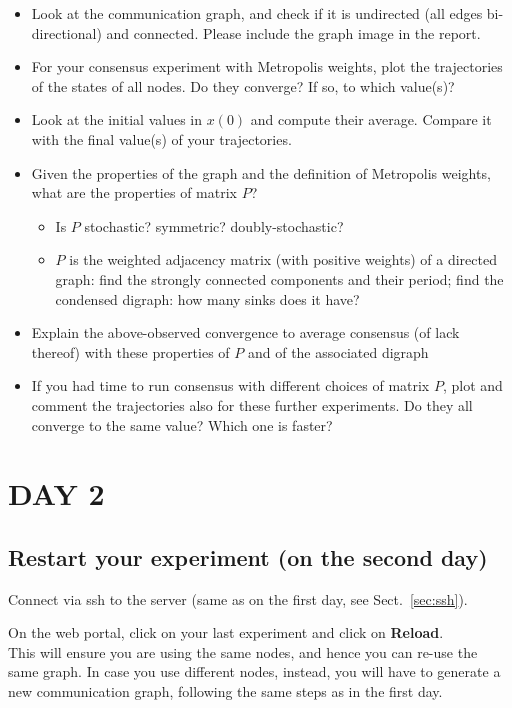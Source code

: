 \documentclass[oneside]{article}
\begin{document}
\begin{itemize}
\item Look at the communication graph, and check if it is undirected (all edges bi-directional) and connected. Please include the graph image in the report.
\item For your consensus experiment with Metropolis weights, plot the trajectories of the states of all nodes. Do they converge? If so, to which value(s)?
\item Look at the initial values in $x(0)$ and compute their average. Compare it with the final value(s) of your trajectories.
\item Given the properties of the graph and the definition of Metropolis weights, what are the properties of matrix $P$? 
	\begin{itemize}
	\item Is $P$ stochastic? symmetric? doubly-stochastic?
	\item  $P$ is the weighted adjacency matrix (with positive weights) of a directed graph: find the strongly connected components and their period; find the condensed digraph: how many sinks does it have?
	\end{itemize}
\item 
Explain the above-observed convergence to average consensus (of lack thereof) with these properties of $P$ and of the associated digraph
\item If you had time to run consensus with different choices of matrix $P$, plot and comment the trajectories also for these further experiments. Do they all converge to the same value? Which one is faster?
\end{itemize}

\newpage

\section*{DAY 2}

\subsection*{Restart your experiment (on the second day)}

Connect via ssh to the server (same as on the first day, see Sect.~\ref{sec:ssh}).

On the web portal, click on your last
experiment and click on \textbf{Reload}. \\
This will ensure you are using the
same nodes, and hence you can re-use the same graph. In case you use different nodes, instead, you will have to generate a new communication graph, following the same steps as in the first day.
\end{document}
